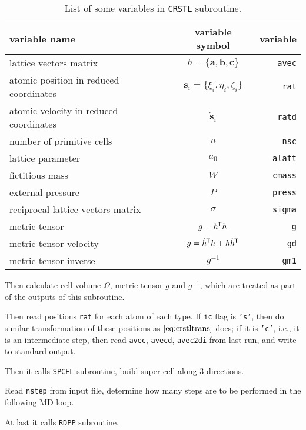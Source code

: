 \begin{table}[h]
 \centering
 \caption{List of some variables in \texttt{CRSTL} subroutine.}
 \begin{tabular}{@{}lcr@{}}
  \toprule
  {variable name}                        & variable symbol                                 & variable       \\
  \midrule
  lattice vectors matrix                 & $h = \{ \bm{a}, \bm{b}, \bm{c} \}$              & \texttt{avec}  \\
  atomic position in reduced coordinates & $\bm{s}_i = \{\xi_i, \eta_i, \zeta_i\}$         & \texttt{rat}   \\
  atomic velocity in reduced coordinates & $\dot{ \bm{s} }_i$                              & \texttt{ratd}  \\
  number of primitive cells              & $n$                                             & \texttt{nsc}   \\
  lattice parameter                      & $a_0$                                           & \texttt{alatt} \\
  fictitious mass                        & $W$                                             & \texttt{cmass} \\
  external pressure                      & $P$                                             & \texttt{press} \\
  reciprocal lattice vectors matrix      & $\sigma$                                        & \texttt{sigma} \\
  metric tensor                          & $g = h ^{\mkern-1.5mu\mathsf{T}} h$                                 & \texttt{g}     \\
  metric tensor velocity                 & $\dot{g} = \dot{ h }^{\mkern-1.5mu\mathsf{T}} h + h \dot{ h }^{\mkern-1.5mu\mathsf{T}}$ & \texttt{gd}    \\
  metric tensor inverse                  & $g^{-1}$                                        & \texttt{gm1}   \\
  \bottomrule
 \end{tabular}%
 \label{tab:crstl}%
\end{table}%

Then calculate cell volume $\Omega$, metric tensor $g$ and $g^{-1}$, which are
treated as part of the outputs of this subroutine.

Then read positions \texttt{rat} for each atom of each type.
If \texttt{ic} flag is \texttt{'s'},
then do similar transformation of these positions as $\eqref{eq:crstltrans}$ does;
if it is \texttt{'c'}, i.e., it is an intermediate step, then read
\texttt{avec}, \texttt{avecd}, \texttt{avec2di} from last run,
and write to standard output.

Then it calls \texttt{SPCEL} subroutine, build super cell along $3$ directions.

Read \texttt{nstep} from input file, determine how many steps are
to be performed in the following MD loop.

At last it calls \texttt{RDPP} subroutine.